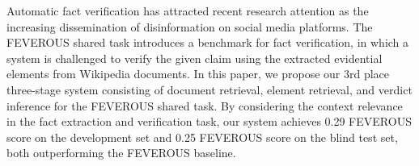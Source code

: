 Automatic fact verification has attracted recent research attention as the increasing dissemination of disinformation on social media platforms. The FEVEROUS shared task introduces a benchmark for fact verification, in which a system is challenged to verify the given claim using the extracted evidential elements from Wikipedia documents. In this paper, we propose our 3rd place three-stage system consisting of document retrieval, element retrieval, and verdict inference for the FEVEROUS shared task. By considering the context relevance in the fact extraction and verification task, our system achieves 0.29 FEVEROUS score on the development set and 0.25 FEVEROUS score on the blind test set, both outperforming the FEVEROUS baseline.
